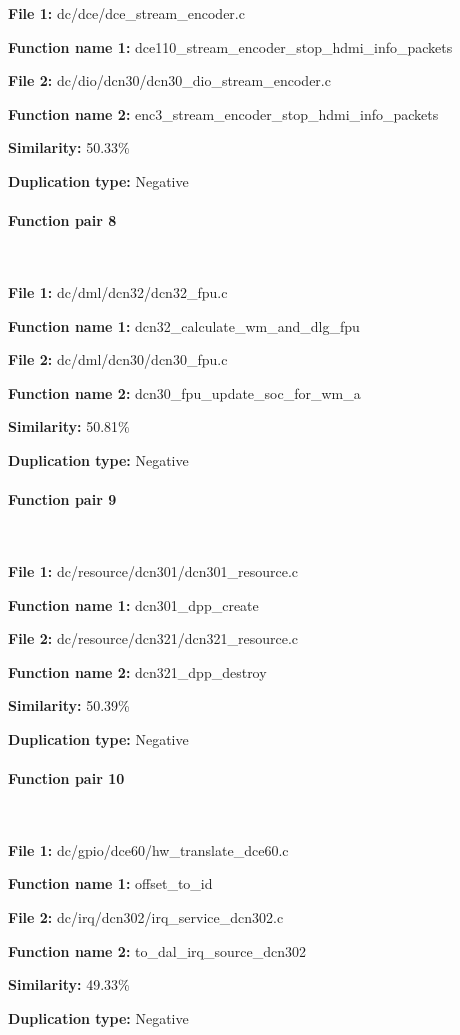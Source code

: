 \textbf{File 1:} dc/dce/dce\_stream\_encoder.c

\textbf{Function name 1:} dce110\_stream\_encoder\_stop\_hdmi\_info\_packets

\textbf{File 2:} dc/dio/dcn30/dcn30\_dio\_stream\_encoder.c

\textbf{Function name 2:} enc3\_stream\_encoder\_stop\_hdmi\_info\_packets

\textbf{Similarity:} 50.33\%

\textbf{Duplication type:} Negative


\paragraph{Function pair 8 }  

\

\textbf{File 1:} dc/dml/dcn32/dcn32\_fpu.c

\textbf{Function name 1:} dcn32\_calculate\_wm\_and\_dlg\_fpu

\textbf{File 2:} dc/dml/dcn30/dcn30\_fpu.c

\textbf{Function name 2:} dcn30\_fpu\_update\_soc\_for\_wm\_a

\textbf{Similarity:} 50.81\%

\textbf{Duplication type:} Negative


\paragraph{Function pair 9 }  

\

\textbf{File 1:} dc/resource/dcn301/dcn301\_resource.c

\textbf{Function name 1:} dcn301\_dpp\_create

\textbf{File 2:} dc/resource/dcn321/dcn321\_resource.c

\textbf{Function name 2:} dcn321\_dpp\_destroy

\textbf{Similarity:} 50.39\%

\textbf{Duplication type:} Negative


\paragraph{Function pair 10 }  

\

\textbf{File 1:} dc/gpio/dce60/hw\_translate\_dce60.c

\textbf{Function name 1:} offset\_to\_id

\textbf{File 2:} dc/irq/dcn302/irq\_service\_dcn302.c

\textbf{Function name 2:} to\_dal\_irq\_source\_dcn302

\textbf{Similarity:} 49.33\%

\textbf{Duplication type:} Negative



